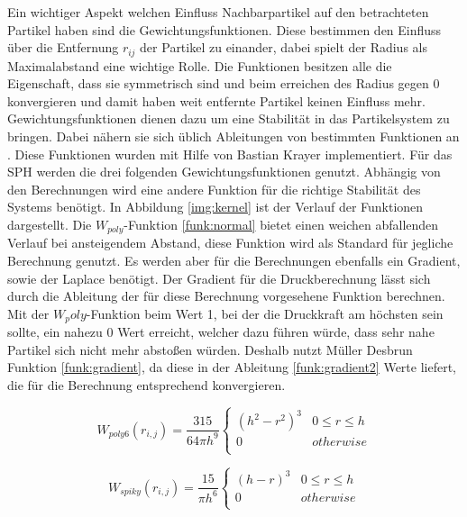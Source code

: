 \documentclass[intern,palatino]{cgBA}
\begin{document}
Ein wichtiger Aspekt welchen Einfluss Nachbarpartikel auf den betrachteten Partikel haben sind die Gewichtungsfunktionen. Diese bestimmen den Einfluss über die Entfernung $r_{ij}$ der Partikel zu einander, dabei spielt der Radius als Maximalabstand eine wichtige Rolle. Die Funktionen besitzen alle die Eigenschaft, dass sie symmetrisch sind und beim erreichen des Radius gegen 0 konvergieren und damit haben weit entfernte Partikel keinen Einfluss mehr. Gewichtungsfunktionen dienen dazu um eine Stabilität in das Partikelsystem zu bringen. Dabei nähern sie sich üblich Ableitungen von bestimmten Funktionen an \cite{muller2003particle}. Diese Funktionen wurden mit Hilfe von Bastian Krayer implementiert.
\newline
Für das SPH werden die drei folgenden Gewichtungsfunktionen genutzt. Abhängig von den Berechnungen wird eine andere Funktion für die richtige Stabilität des Systems benötigt. In Abbildung \ref{img:kernel} ist der Verlauf der Funktionen dargestellt.
\newline
Die $W_{poly}$-Funktion \ref{funk:normal} bietet einen weichen abfallenden Verlauf bei ansteigendem Abstand, diese Funktion wird als Standard für jegliche Berechnung genutzt.
\newline
Es werden aber für die Berechnungen ebenfalls ein Gradient, sowie der Laplace benötigt. Der Gradient für die Druckberechnung lässt sich durch die Ableitung der für diese Berechnung vorgesehene Funktion berechnen. Mit der $W_poly$-Funktion beim Wert 1, bei der die Druckkraft am höchsten sein sollte, ein nahezu 0 Wert erreicht, welcher dazu führen würde, dass sehr nahe Partikel sich nicht mehr abstoßen würden. Deshalb nutzt Müller Desbrun \cite{desbrun1996smoothed} Funktion \ref{funk:gradient}, da diese in der Ableitung \ref{funk:gradient2} Werte liefert, die für die Berechnung entsprechend konvergieren.
\newline\newline

\begin{equation}\label{funk:normal}
	W_{poly6}(r_{i,j}) = \frac{315}{64 \pi h^9}   
	\begin{cases}
	(h^2 - r^2)^3 		& 0	\leq r \leq h	\\
	0					& otherwise			\\
	\end{cases}
\end{equation}

\begin{equation}\label{funk:gradient}
W_{spiky}(r_{i,j}) = \frac{15}{\pi h^6}   
\begin{cases}
(h - r)^3 		& 0	\leq r \leq h	\\
0					& otherwise			\\
\end{cases}
\end{equation}
\end{document}
